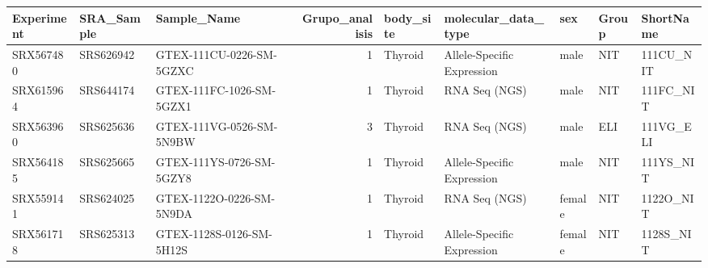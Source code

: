 \documentclass[
]{article}
\begin{document}
\begin{longtable}[]{@{}lllrlllll@{}}
\toprule
Experiment & SRA\_Sample & Sample\_Name & Grupo\_analisis & body\_site &
molecular\_data\_type & sex & Group & ShortName\tabularnewline
\midrule
\endhead
SRX567480 & SRS626942 & GTEX-111CU-0226-SM-5GZXC & 1 & Thyroid &
Allele-Specific Expression & male & NIT & 111CU\_NIT\tabularnewline
SRX615964 & SRS644174 & GTEX-111FC-1026-SM-5GZX1 & 1 & Thyroid & RNA Seq
(NGS) & male & NIT & 111FC\_NIT\tabularnewline
SRX563960 & SRS625636 & GTEX-111VG-0526-SM-5N9BW & 3 & Thyroid & RNA Seq
(NGS) & male & ELI & 111VG\_ELI\tabularnewline
SRX564185 & SRS625665 & GTEX-111YS-0726-SM-5GZY8 & 1 & Thyroid &
Allele-Specific Expression & male & NIT & 111YS\_NIT\tabularnewline
SRX559141 & SRS624025 & GTEX-1122O-0226-SM-5N9DA & 1 & Thyroid & RNA Seq
(NGS) & female & NIT & 1122O\_NIT\tabularnewline
SRX561718 & SRS625313 & GTEX-1128S-0126-SM-5H12S & 1 & Thyroid &
Allele-Specific Expression & female & NIT & 1128S\_NIT\tabularnewline
\bottomrule
\end{longtable}
\end{document}

